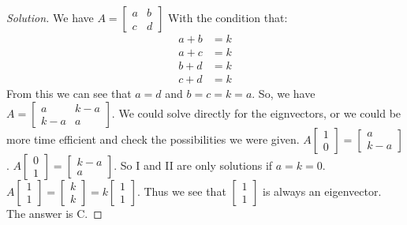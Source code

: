 \documentclass[12pt,oneside]{book}
\theoremstyle{mystyle}
\begin{document}
\begin{proof}[Solution]
We have $A = \begin{bmatrix} a & b \\ c & d\end{bmatrix}$ With the condition that:
\begin{align}
    \nonumber a+b &= k \\
    \nonumber a+c &= k \\
    \nonumber b+d &= k \\
    \nonumber c+d &= k
\end{align}
From this we can see that $a = d$ and $b=c = k=a$.
So, we have $A = \begin{bmatrix} a & k-a \\ k-a & a\end{bmatrix}$. We could solve directly for the eignvectors, or we could be more time efficient and check the possibilities we were given. $A\begin{bmatrix}1 \\ 0 \end{bmatrix} = \begin{bmatrix} a \\ k-a \end{bmatrix}$. $A\begin{bmatrix} 0 \\ 1 \end{bmatrix} = \begin{bmatrix} k-a \\ a \end{bmatrix}$. So I and II are only solutions if $a = k = 0$. $A\begin{bmatrix} 1 \\ 1 \end{bmatrix} = \begin{bmatrix} k \\ k\end{bmatrix} = k \begin{bmatrix} 1 \\ 1 \end{bmatrix}$. Thus we see that $\begin{bmatrix} 1 \\ 1 \end{bmatrix}$ is always an eigenvector. The answer is C.
\end{proof}
\end{document}

